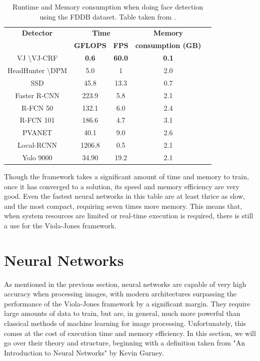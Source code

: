 \documentclass[11pt,a4paper,oldfontcommands]{memoir}
\begin{document}
\begin{table}[b]
\centering
    \begin{tabular}{|c||c|c|c|c|c|} 
        \hline
        \textbf{Detector} & \multicolumn{2}{c|}{\textbf{Time}} & \multicolumn{2}{c|}{\textbf{Memory}} \\ 
         & \textbf{GFLOPS} & \textbf{FPS} & \multicolumn{2}{c|}{\textbf{consumption (GB)}} \\
        \hline\hline
        VJ \cite{viola} \textbackslash \space VJ-CRF \cite{VJ_CRF} & \textbf{0.6} & \textbf{60.0} & \multicolumn{2}{c|}{\textbf{0.1}} \\ 
        \hline
        HeadHunter \cite{HeadHunter} \textbackslash \space DPM \cite{DPM} & 5.0 & 1 & \multicolumn{2}{c|}{2.0} \\
        \hline
        \hline
        SSD \cite{SDD} & 45.8 & 13.3 & \multicolumn{2}{c|}{0.7} \\
        \hline
        Faster R-CNN \cite{FRCNN} & 223.9 & 5.8 & \multicolumn{2}{c|}{2.1} \\
        \hline
        R-FCN 50 \cite{RFCN} & 132.1 & 6.0 & \multicolumn{2}{c|}{2.4} \\
        \hline
        R-FCN 101 \cite{RFCN} & 186.6 & 4.7 & \multicolumn{2}{c|}{3.1} \\
        \hline
        PVANET \cite{RFCN} & 40.1 & 9.0 & \multicolumn{2}{c|}{2.6} \\
        \hline
        Local-RCNN \cite{LRCNN} & 1206.8 & 0.5 & \multicolumn{2}{c|}{2.1} \\ 
        \hline  
        Yolo 9000 \cite{YOLO9000} & 34.90 & 19.2 & \multicolumn{2}{c|}{2.1} \\ 
        \hline  
    \end{tabular}
\caption{Runtime and Memory consumption when doing face detection using the FDDB \cite{ds:FDDB_Dataset} dataset. Table taken from \cite{Face_detection_Comparison}.}
\label{tab:vj_mem}
\end{table}

Though the framework takes a significant amount of time and memory to train, once it has converged to a solution, its speed and memory efficiency are very good. Even the fastest neural networks in this table are at least thrice as slow, and the most compact, requiring seven times more memory. This means that, when system resources are limited or real-time execution is required, there is still a use for the Viola-Jones framework.

\section{Neural Networks}
As mentioned in the previous section, neural networks are capable of very high accuracy when processing images, with modern architectures surpassing the performance of the Viola-Jones framework by a significant margin. They require large amounts of data to train, but are, in general, much more powerful than classical methods of machine learning for image processing. Unfortunately, this comes at the cost of execution time and memory efficiency. In this section, we will go over their theory and structure, beginning with a definition taken from "An Introduction to Neural Networks" by Kevin Gurney.
\end{document}
